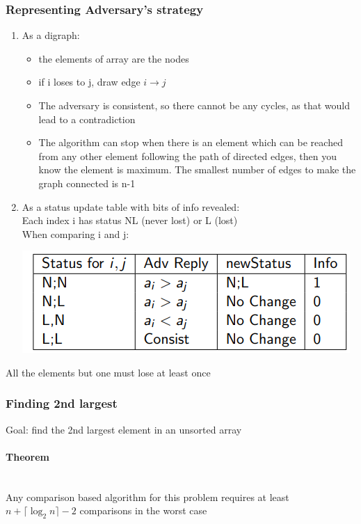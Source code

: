\documentclass{article}[18pt]
\begin{document}
\subsubsection{Representing Adversary's strategy}
\begin{enumerate}
	\item As a digraph:
	\begin{itemize}
	\item the elements of array are the nodes
	\item if i loses to j, draw edge $i\rightarrow j$
	\item The adversary is consistent, so there cannot be any cycles, as that would lead to a contradiction
	\item The algorithm can stop when there is an element which can be reached from any other element following the path of directed edges, then you know the element is maximum. The smallest number of edges to make the graph connected is n-1
	\end{itemize}
	\item As a status update table with bits of info revealed:\\
	Each index i has status NL (never lost) or L (lost)\\
	When comparing i and j:
	\begin{center}
	\includegraphics[scale=0.7]{adversary}
	\end{center}
	
\end{enumerate}
All the elements but one must lose at least once
\subsubsection{Finding 2nd largest}
Goal: find the 2nd largest element in an unsorted array
\paragraph{Theorem}$ $\\
Any comparison based algorithm for this problem requires at least $n+\lceil \log_2 n\rceil -2$ comparisons in the worst case
\end{document}
